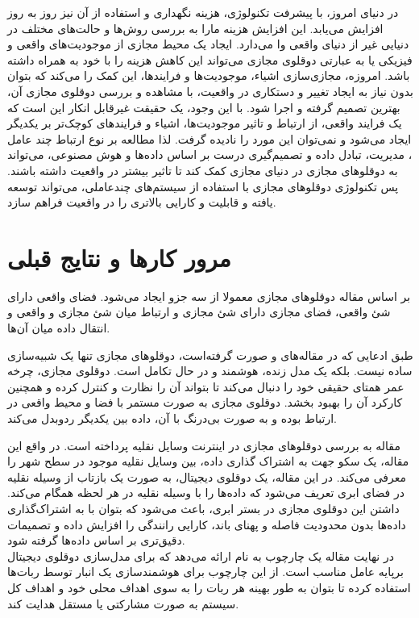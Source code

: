 \documentclass[a4paper,fleqn]{article}
\begin{document}
در دنیای امروز، با پیشرفت تکنولوژی، هزینه نگهداری و استفاده از آن نیز روز به روز افزایش می‌یابد. این افزایش هزینه مارا به بررسی روش‌ها و حالت‌های مختلف در دنیایی غیر از دنیای واقعی وا می‌دارد. ایجاد یک محیط مجازی از موجودیت‌های واقعی و فیزیکی یا به عبارتی دوقلوی مجازی 
می‌تواند این کاهش هزینه‌ را با خود به همراه داشته باشد. امروزه، مجازی‌سازی اشیاء، موجودیت‌ها و فرایند‌ها، این کمک را می‌کند که بتوان بدون نیاز به ایجاد تغییر و دستکاری در واقعیت، با مشاهده و بررسی دوقلوی مجازی آن، بهترین تصمیم گرفته و اجرا شود. 
با این وجود، یک حقیقت غیرقابل انکار این است که یک فرایند واقعی، از ارتباط و تاثیر موجودیت‌ها، اشیاء و فرایند‌های کوچک‌تر بر یکدیگر ایجاد می‌شود و نمی‌توان این مورد را نادیده گرفت. لذا مطالعه بر نوع ارتباط چند عامل
، مدیریت،‌ تبادل داده و تصمیم‌گیری درست بر اساس داده‌ها و هوش مصنوعی، می‌تواند به دوقلو‌های مجازی در دنیای مجازی کمک کند تا تاثیر بیشتر در واقعیت داشته‌ باشند.
پس تکنولوژی دوقلو‌های مجازی با استفاده از سیستم‌های چندعاملی، می‌تواند توسعه یافته و قابلیت و کارایی بالاتری را در واقعیت فراهم سازد.


\section{مرور کارها و نتایج  قبلی }

بر اساس مقاله 
\cite{b1}
دوقلو‌های مجازی معمولا از سه جزو ایجاد می‌شود. فضای واقعی دارای شئ واقعی، فضای مجازی دارای شئ مجازی و ارتباط میان شئ مجازی و واقعی و انتقال داده ‌میان آن‌ها.

طبق ادعایی که در مقاله‌های 
\cite{b2}
و
\cite{b3}
صورت گرفته‌است، دوقلو‌های مجازی تنها یک شبیه‌سازی ساده نیست. بلکه یک مدل زنده، هوشمند و در حال تکامل است. دوقلوی مجازی، چرخه عمر همتای حقیقی خود را دنبال می‌کند تا بتواند آن را نظارت
و کنترل
کرده و همچنین کارکرد آن را بهبود بخشد. دوقلوی مجازی به صورت مستمر با فضا و محیط واقعی در ارتباط بوده و به صورت بی‌درنگ با آن، داده‌ بین یکدیگر ردوبدل می‌کند.


 مقاله 
 \cite{b4}
 به بررسی دوقلو‌های مجازی در اینترنت وسایل‌ نقلیه
 پرداخته است. در واقع این مقاله، یک سکو
 جهت به اشتراک گذاری داده، بین وسایل نقلیه موجود در سطح شهر را معرفی می‌کند. در این مقاله، یک دوقلوی دیجیتال، به صورت یک بازتاب از وسیله نقلیه در فضای ابری تعریف می‌شود که داده‌ها را با وسیله نقلیه در هر لحظه همگام می‌کند. داشتن این دوقلوی مجازی در بستر ابری، باعث می‌شود که بتوان با به اشتراک‌گذاری داده‌ها بدون محدودیت فاصله و پهنای باند، کارایی رانندگی را افزایش داده و تصمیمات دقیق‌تری بر اساس داده‌ها گرفته‌ شود.\\
در نهایت مقاله 
\cite{b5}
یک چارچوب
 به نام 
ارائه می‌دهد که برای مدل‌سازی دوقلوی دیجیتال برپایه عامل‌
مناسب است. از این چارچوب برای هوشمند‌سازی یک انبار‌ توسط ربات‌ها استفاده کرده تا بتوان به طور بهینه هر ربات را به سوی اهداف محلی خود و اهداف کل سیستم به صورت مشارکتی یا مستقل هدایت کند.
\end{document}
